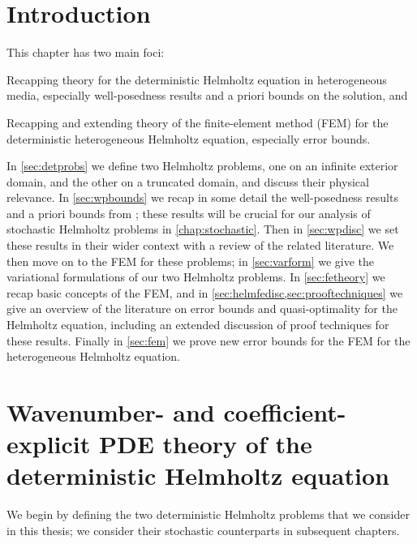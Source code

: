 \section{Introduction}
This chapter has two main foci:
\ben
\item Recapping theory for the deterministic Helmholtz equation in heterogeneous media, especially well-posedness results and a priori bounds on the solution, and
\item Recapping and extending theory of the finite-element method (FEM) for the deterministic heterogeneous Helmholtz equation, especially error bounds.
  \een


In \cref{sec:detprobs} we  define two Helmholtz problems, one on an infinite exterior domain, and the other on a truncated domain, and discuss their physical relevance. In \cref{sec:wpbounds} we  recap in some detail the well-posedness results and a priori bounds from \cite{GrPeSp:19}; these results will be crucial for our analysis of stochastic Helmholtz problems in \cref{chap:stochastic}. Then in \cref{sec:wpdisc} we set these results in their wider context with a review of the related literature. We  then move on to the FEM for these problems; in \cref{sec:varform} we give the variational formulations of our two Helmholtz problems. In \cref{sec:fetheory} we recap basic concepts of the FEM, and in \cref{sec:helmfedisc,sec:prooftechniques} we  give an overview of the literature on error bounds and quasi-optimality for the Helmholtz equation, including an extended discussion of proof techniques for these results. Finally in \cref{sec:fem} we  prove new error bounds for the FEM for the heterogeneous Helmholtz equation. 


\section[PDE theory of the Helmholtz Equation]{Wavenumber- and coefficient-explicit PDE theory of the deterministic Helmholtz equation}\label{sec:pdetheory}
  We  begin by defining the two deterministic Helmholtz problems that we consider in this thesis; we  consider their stochastic counterparts in subsequent chapters.

